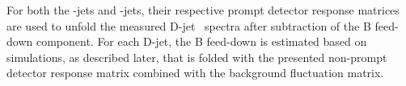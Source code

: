 For both the \Dstar-jets and \Dzero-jets, their respective prompt detector response matrices are used to unfold the measured D-jet \pt\ spectra after subtraction of the B feed-down component. 
For each D-jet, the B feed-down is estimated based on simulations, as described later, that is folded with the presented non-prompt detector response matrix combined with the background fluctuation matrix.
%
%
%
%
%
%
%



